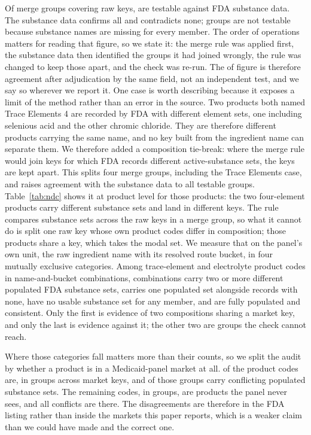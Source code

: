 \documentclass[pdflatex,sn-vancouver-num,Numbered]{sn-jnl}
\begin{document}
Of \nMergeGroups merge groups covering \nMergeKeys raw keys, \nTestable are testable against FDA substance data. The
substance data confirms all \nConfirmed and contradicts none; \nUntestable groups are not
testable because substance names are missing for every member. The order of operations matters
for reading that figure, so we state it: the merge rule was applied first, the substance data
then identified the groups it had joined wrongly, the rule was changed to keep those apart, and
the check was re-run. The \nConfirmed of \nConfirmed figure is therefore agreement after
adjudication by the same field, not an independent test, and we say so wherever we report it.
One case is worth describing because it exposes a limit of the method rather than an error in
the source. Two products both named Trace Elements 4 are recorded by FDA with different element
sets, one including selenious acid and the other chromic chloride. They are therefore different
products carrying the same name, and no key built from the ingredient name can separate them.
We therefore added a composition tie-break: where the merge rule would join keys for which FDA
records different active-substance sets, the keys are kept apart. This splits four merge groups,
including the Trace Elements case, and raises agreement with the substance data to all \nConfirmed
testable groups. Table~\ref{tab:ndc} shows it at product level for those products: the two
four-element products carry different substance sets and land in different keys. The rule compares
substance sets across the raw keys in a merge group, so what it cannot do is split one raw key
whose own product codes differ in composition; those products share a key, which takes the modal
set. We measure that on the panel's own unit, the raw ingredient name with its resolved route
bucket, in four mutually exclusive categories. Among \nNdcCodes trace-element and electrolyte
product codes in \nNdcCombos name-and-bucket combinations, \nNdcMulti combinations carry two or
more different populated FDA substance sets, \nNdcMixed carries one populated set alongside
records with none, \nNdcAllMissing have no usable substance set for any member, and \nNdcClean are
fully populated and consistent. Only the first is evidence of two compositions sharing a market
key, and only the last is evidence against it; the other two are groups the check cannot reach.

Where those categories fall matters more than their counts, so we split the audit by whether a
product is in a Medicaid-panel market at all. \nNdcAssigned of the product codes are, in
\nNdcAssignedGroups groups across \nNdcKeys market keys, and \nNdcPanelConflicts of those groups
carry conflicting populated substance sets. The remaining \nNdcUnassigned codes, in
\nNdcUnassignedGroups groups, are products the panel never sees, and all \nNdcOutConflicts
conflicts are there. The disagreements are therefore in the FDA listing rather than inside the
markets this paper reports, which is a weaker claim than we could have made and the correct one.
\end{document}
